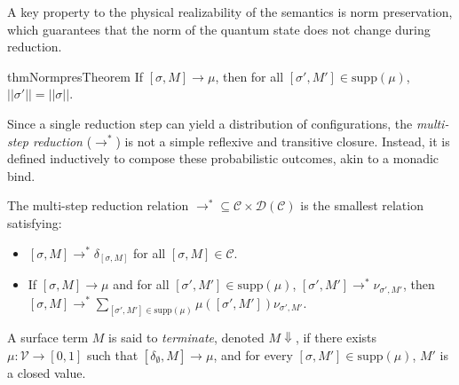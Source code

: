 A key property to the physical realizability of the semantics is norm preservation, which guarantees that the norm of the quantum state does not change during reduction.
\begin{restatable}{thm}{NormpresTheorem} \label{thm:norm-pres}
  If $[\sigma,M] \longrightarrow \mu$, then for all $[\sigma',M']\in\mathrm{supp}(\mu)$, $||\sigma'|| = ||\sigma||$.
\end{restatable}

Since a single reduction step can yield a distribution of configurations, the \textit{multi-step reduction} ($\longrightarrow^*$) is not a simple reflexive and transitive closure. Instead, it is defined inductively to compose these probabilistic outcomes, akin to a monadic bind.
\begin{dfn}
  The multi-step reduction relation $\longrightarrow^*\subseteq \mathcal{C}\times \mathcal{D}(\mathcal{C})$ is the smallest relation satisfying:
  \begin{itemize}
    \item $[\sigma,M] \longrightarrow^*\delta_{[\sigma,M]}$ for all $[\sigma,M]\in\mathcal{C}$.
    \item If $[\sigma,M] \longrightarrow \mu$ and for all $[\sigma',M']\in\mathrm{supp}(\mu)$, $[\sigma',M'] \longrightarrow^*\nu_{\sigma',M'}$, then $[\sigma,M] \longrightarrow^*\sum_{[\sigma',M']\in\mathrm{supp}(\mu)} \mu([\sigma',M'])\nu_{\sigma',M'}$.
  \end{itemize}
\end{dfn}

\begin{dfn}[Termination]
  A surface term $M$ is said to \emph{terminate}, denoted $M\Downarrow$, if there exists $\mu : \mathcal{V} \to [0,1]$ such that $[\delta_\emptyset, M] \longrightarrow\mu$, and for every $[\sigma, M'] \in \mathrm{supp}(\mu)$, $M'$ is a closed value.
\end{dfn}
